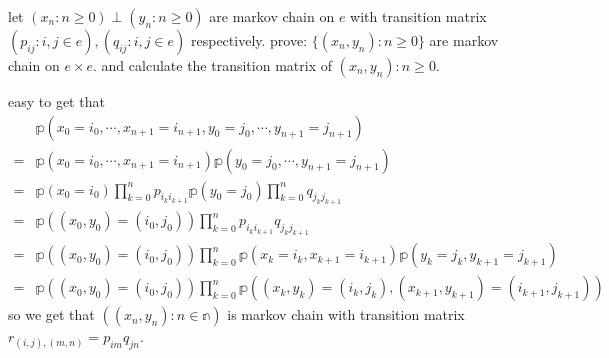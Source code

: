 \documentclass{ctexart}
\newif\ifpreface
\begin{document}
\large
\setlength{\baselineskip}{1.2em}
\ifpreface
  
\else
\fi
{}
\allowdisplaybreaks[4]
\begin{problem}\label{pro:1}
  let \((x_n:n \geq 0)\perp (y_n: n \geq 0)\) are markov chain on \(e\) with
  transition matrix \((p_{ij}:i,j \in e),(q_{ij}:i,j \in e)\) respectively.
  prove: \(\{(x_n,y_n):n \geq 0\}\) are markov chain on \(e \times e\).
  and calculate the transition matrix of \((x_n,y_n):n \geq 0\).
\end{problem}
\begin{solution}
  easy to get that
  \[
    \begin{aligned}
       & \mathbb{p}(x_0=i_0,\cdots,x_{n+1} =i_{n+1},y_0=j_0,\cdots,y_{n+1}=j_{n+1})
      \\= & \mathbb{p}(x_0=i_0,\cdots,x_{n+1} =i_{n+1})\mathbb{p}(y_0=j_0,\cdots,y_{n+1}=j_{n+1})
      \\= & \mathbb{p}(x_0=i_0)\prod_{k=0}^{n} p_{i_k i_{k+1} } \mathbb{p}(y_0=j_0) \prod_{k=0}^{n} q_{j_k j_{k+1}}
      \\= & \mathbb{p}((x_0,y_0)=(i_0,j_0)) \prod_{k=0}^{n} p_{i_k i_{k+1} } q_{j_k j_{k+1}}
      \\= & \mathbb{p}((x_0,y_0)=(i_0,j_0)) \prod_{k=0}^{n} \mathbb{p}(x_k = i_k,x_{k + 1}=i_{k + 1})\mathbb{p}(y_k=j_k,y_{k + 1}=j_{k + 1})
      \\=& \mathbb{p}((x_0,y_0)=(i_0,j_0)) \prod_{k=0}^{n} \mathbb{p}((x_k,y_{k})=(i_k,j_{k}),(x_{k + 1},y_{k + 1})=(i_{k + 1},j_{k + 1}))
    \end{aligned}
  \]
  so we get that \(\left((x_n,y_n): n \in \mathbb{n}\right)\) is markov chain with transition matrix
  \(r_{(i,j),(m,n)}=p_{im}q_{jn}\).
\end{solution}
\end{document}
